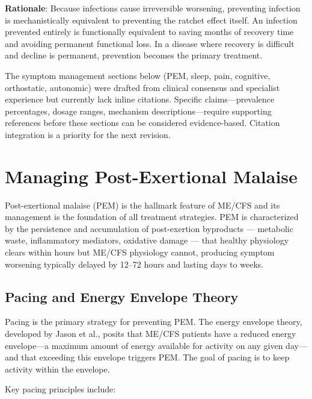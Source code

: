 \begin{observation}
\textbf{Rationale}: Because infections cause irreversible worsening, preventing infection is mechanistically equivalent to preventing the ratchet effect itself. An infection prevented entirely is functionally equivalent to saving months of recovery time and avoiding permanent functional loss. In a disease where recovery is difficult and decline is permanent, prevention becomes the primary treatment.
\end{observation}

\begin{limitation}
The symptom management sections below (PEM, sleep, pain, cognitive, orthostatic, autonomic) were drafted from clinical consensus and specialist experience but currently lack inline citations. Specific claims---prevalence percentages, dosage ranges, mechanism descriptions---require supporting references before these sections can be considered evidence-based. Citation integration is a priority for the next revision.
\end{limitation}

\section{Managing Post-Exertional Malaise}
\label{sec:managing-pem}

Post-exertional malaise (PEM) is the hallmark feature of ME/CFS and its management is the foundation of all treatment strategies. PEM is characterized by the persistence and accumulation of post-exertion byproducts --- metabolic waste, inflammatory mediators, oxidative damage --- that healthy physiology clears within hours but ME/CFS physiology cannot, producing symptom worsening typically delayed by 12--72 hours and lasting days to weeks.

\subsection{Pacing and Energy Envelope Theory}

Pacing is the primary strategy for preventing PEM. The energy envelope theory, developed by Jason et al., posits that ME/CFS patients have a reduced energy envelope---a maximum amount of energy available for activity on any given day---and that exceeding this envelope triggers PEM. The goal of pacing is to keep activity within the envelope.

Key pacing principles include:

